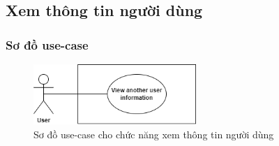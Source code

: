 \subsection{Xem thông tin người dùng}
\subsubsection{Sơ đồ use-case}
\begin{figure}[H]
    \centering
    \includegraphics[width=0.55\textwidth]{Images/UseCase/User.png}
    \caption{Sơ đồ use-case cho chức năng xem thông tin người dùng}
\end{figure}
\newpage
